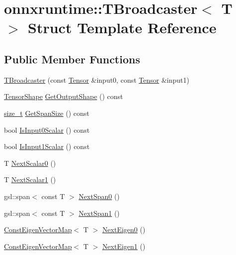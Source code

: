 \hypertarget{structonnxruntime_1_1TBroadcaster}{}\section{onnxruntime\+:\+:T\+Broadcaster$<$ T $>$ Struct Template Reference}
\label{structonnxruntime_1_1TBroadcaster}
\subsection*{Public Member Functions}
\begin{DoxyCompactItemize}
\item 
\mbox{\hyperlink{structonnxruntime_1_1TBroadcaster_a766c89ca8afa8556f1499370b5b543d5}{T\+Broadcaster}} (const \mbox{\hyperlink{classonnxruntime_1_1Tensor}{Tensor}} \&input0, const \mbox{\hyperlink{classonnxruntime_1_1Tensor}{Tensor}} \&input1)
\item 
\mbox{\hyperlink{classonnxruntime_1_1TensorShape}{Tensor\+Shape}} \mbox{\hyperlink{structonnxruntime_1_1TBroadcaster_ab81d65c49997252be8e21a7951c857a4}{Get\+Output\+Shape}} () const
\item 
\mbox{\hyperlink{mlasi_8h_a503efbc1c6e50825320ad909366b78ab}{size\+\_\+t}} \mbox{\hyperlink{structonnxruntime_1_1TBroadcaster_a444219eecd7eb6cc298ba9f5cd474436}{Get\+Span\+Size}} () const
\item 
bool \mbox{\hyperlink{structonnxruntime_1_1TBroadcaster_ada7db0a8a599bccf3ffd925504f51b1a}{Is\+Input0\+Scalar}} () const
\item 
bool \mbox{\hyperlink{structonnxruntime_1_1TBroadcaster_a05b6cdbd98d3029321664f1749e38e91}{Is\+Input1\+Scalar}} () const
\item 
T \mbox{\hyperlink{structonnxruntime_1_1TBroadcaster_aa19d291506c41f9a3704edd24ff62bfd}{Next\+Scalar0}} ()
\item 
T \mbox{\hyperlink{structonnxruntime_1_1TBroadcaster_a9262a18b6eb2bbee43aaa33746239929}{Next\+Scalar1}} ()
\item 
gsl\+::span$<$ const T $>$ \mbox{\hyperlink{structonnxruntime_1_1TBroadcaster_ab6bfd02bc607dae7e9697ff958876da4}{Next\+Span0}} ()
\item 
gsl\+::span$<$ const T $>$ \mbox{\hyperlink{structonnxruntime_1_1TBroadcaster_ad3857715179a0ccf354ca60d69890647}{Next\+Span1}} ()
\item 
\mbox{\hyperlink{namespaceonnxruntime_a16eca66228ee3a40fe3ae89db53e08ee}{Const\+Eigen\+Vector\+Map}}$<$ T $>$ \mbox{\hyperlink{structonnxruntime_1_1TBroadcaster_af19e6199bad783d2c6b3b40b09f7e8df}{Next\+Eigen0}} ()
\item 
\mbox{\hyperlink{namespaceonnxruntime_a16eca66228ee3a40fe3ae89db53e08ee}{Const\+Eigen\+Vector\+Map}}$<$ T $>$ \mbox{\hyperlink{structonnxruntime_1_1TBroadcaster_aca09cafcab37af122fc0726534c71590}{Next\+Eigen1}} ()
\end{DoxyCompactItemize}


